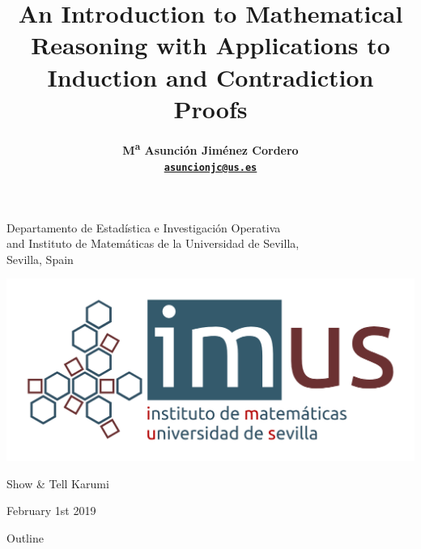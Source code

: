 \documentclass[11pt,a4paper,xcolor=dvipsnames, leqno]{beamer}
\title[Introduction to Mathematical
Reasoning. Induction \& Contradiction Proofs]{An Introduction to Mathematical
Reasoning with Applications to
Induction and Contradiction Proofs}
\author[M\textsuperscript{a} Asunci\'on Jim\'enez Cordero]
{{{\bf M\textsuperscript{a} Asunci\'on Jim\'enez Cordero\\
{\href{mailto:asuncionjc@us.es}{\tt asuncionjc@us.es}}}}}
\institute{Show & Tell Karumi} %
\date{}
\begin{document}
\begingroup 
    \begin{frame}
        \titlepage
\begin{center}
\insertauthor\par
\end{center}
\begin{center}
        \scriptsize Departamento de Estad\'istica e Investigaci\'on Operativa\\ and Instituto de Matem\'aticas de la Universidad de Sevilla,\\
        Sevilla, Spain
        \end{center}
        
\vspace*{0.3cm}
\begin{center}
\includegraphics[scale=0.35]{imus_basico_oct.png}
\end{center}
\begin{center}
\scriptsize{Show \& Tell Karumi}
\end{center}
\begin{center}
\footnotesize{February 1st 2019}
\end{center}
\end{frame}
\endgroup





\begin{without_headline}
    \begin{frame}{Outline} %
        \tableofcontents
    \end{frame}
\end{without_headline}
\end{document}
